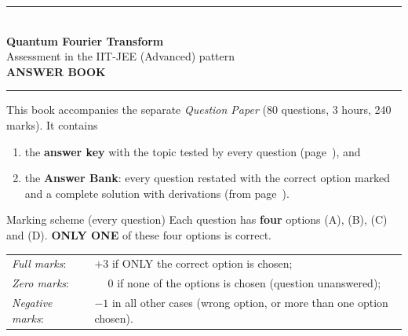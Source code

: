 \documentclass[11pt,a4paper]{article}
\begin{document}
\pagestyle{fancy}\fancyhf{}
\renewcommand{\headrulewidth}{0.4pt}

\thispagestyle{empty}
\begin{center}
{\color{brand}\rule{\linewidth}{1.2pt}}\\[6pt]
{\Huge\bfseries\color{brand} Quantum Fourier Transform}\\[4pt]
{\Large Assessment in the IIT-JEE (Advanced) pattern}\\[4pt]
{\large\bfseries ANSWER BOOK}\\[2pt]
{\color{brand}\rule{\linewidth}{1.2pt}}
\end{center}
This book accompanies the separate \emph{Question Paper} (80 questions, 3 hours, 240 marks). It contains
\begin{enumerate}[leftmargin=1.4em, itemsep=0pt, topsep=2pt]
\item the \textbf{answer key} with the topic tested by every question (page~\pageref{key}), and
\item the \textbf{Answer Bank}: every question restated with the correct option marked \textcolor{okgreen}{} and a
      complete solution with derivations (from page~\pageref{bank}).
\end{enumerate}
\begin{infobox}{Marking scheme (every question)}
Each question has \textbf{four} options (A), (B), (C) and (D). \textbf{ONLY ONE} of these four options is correct.\\[2pt]
\begin{tabular}{@{}ll@{}}
\emph{Full marks}: & $+3$ if ONLY the correct option is chosen;\\
\emph{Zero marks}: & $\phantom{+}0$ if none of the options is chosen (question unanswered);\\
\emph{Negative marks}: & $-1$ in all other cases (wrong option, or more than one option chosen).
\end{tabular}
\end{infobox}
\end{document}
